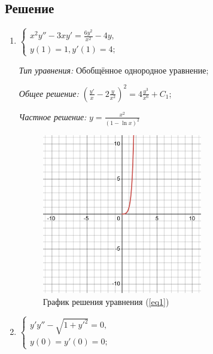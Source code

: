     \subsection{Решение}
        \begin{enumerate}
            \item \( \begin{cases}
                x^2 y'' - 3xy' = \frac{6y^2}{x^2} - 4y, \\
                y(1) = 1, y'(1) = 4;
            \end{cases} \) \label{eq1}
            
                \textit{Тип уравнения:}
                    Обобщённое однородное уравнение;
                
                \textit{Общее решение:}
                    \( \left( \frac{y'}{x} - 2 \frac{y}{x^2} \right)^2 = 4 \frac{y^3}{x^6} + C_1 \);

                
                \textit{Частное решение:}
                    \( y = \frac{x^2}{\left( 1 - \ln x \right)^2} \)

                \begin{figure}[H]
                    \centering
                    \includegraphics[width=7cm]{pictures/task2_1.pdf}
                    \caption{График решения уравнения (\ref{eq1})}
                \end{figure}
            
            \pagebreak
            
            \item \( \begin{cases}
                y'y'' - \sqrt{1+y'^2} = 0, \\
                y(0) = y'(0) = 0;
            \end{cases} \) \label{eq2}
            

\end{enumerate}
